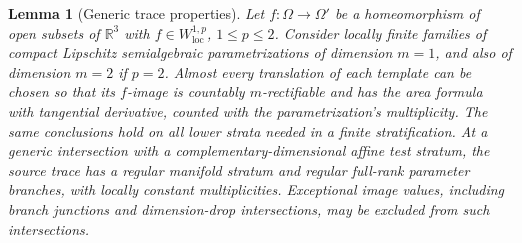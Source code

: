 \documentclass[11pt]{article}
\numberwithin{equation}{section}
\newtheorem{lemma}[theorem]{Lemma}
\theoremstyle{definition}
\theoremstyle{remark}
\begin{document}
\begin{lemma}[Generic trace properties]
\label{lt:trace-slicing}
Let $f:\Omega\to\Omega'$ be a homeomorphism of open subsets of
$\mathbb R^3$ with $f\in W^{1,p}_{\mathrm{loc}}$, $1\leq p\leq2$.
Consider locally finite families of compact Lipschitz semialgebraic
parametrizations of dimension $m=1$, and also of dimension $m=2$ if
$p=2$.  Almost every translation of each template can be chosen so
that its $f$-image is countably $m$-rectifiable and has the area formula
with tangential derivative, counted with the parametrization's
multiplicity.  The same conclusions hold on all lower strata needed
in a finite stratification.  At a generic intersection with a
complementary-dimensional affine test stratum, the source trace has a
regular manifold stratum and regular full-rank parameter branches,
with locally constant multiplicities.  Exceptional image values,
including branch junctions and dimension-drop intersections, may be
excluded from such intersections.
\end{lemma}
\end{document}
